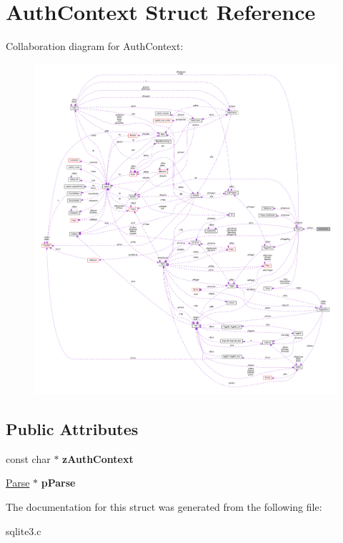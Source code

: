 \hypertarget{struct_auth_context}{\section{Auth\-Context Struct Reference}
\label{struct_auth_context}
}


Collaboration diagram for Auth\-Context\-:\nopagebreak
\begin{figure}[H]
\begin{center}
\leavevmode
\includegraphics[width=350pt]{struct_auth_context__coll__graph}
\end{center}
\end{figure}
\subsection*{Public Attributes}
\begin{DoxyCompactItemize}
\item 
\hypertarget{struct_auth_context_a1b095b152b72326476ac3f7edcaee78a}{const char $\ast$ {\bfseries z\-Auth\-Context}}\label{struct_auth_context_a1b095b152b72326476ac3f7edcaee78a}

\item 
\hypertarget{struct_auth_context_a8df2931d8f4facf59073c92315b00bfa}{\hyperlink{struct_parse}{Parse} $\ast$ {\bfseries p\-Parse}}\label{struct_auth_context_a8df2931d8f4facf59073c92315b00bfa}

\end{DoxyCompactItemize}


The documentation for this struct was generated from the following file\-:\begin{DoxyCompactItemize}
\item 
sqlite3.\-c\end{DoxyCompactItemize}
